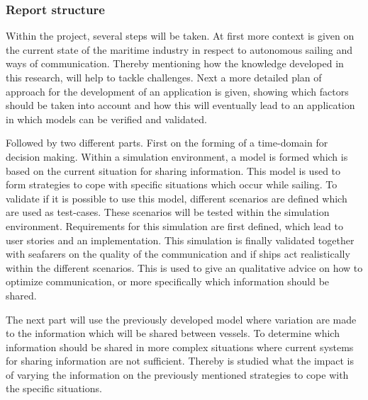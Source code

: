 \subsubsection*{Report structure}
Within the project, several steps will be taken. At first more context is given on the current state of the maritime industry in respect to autonomous sailing and ways of communication. Thereby mentioning how the knowledge developed in this research, will help to tackle challenges.
Next a more detailed plan of approach for the development of an application is given, showing which factors should be taken into account and how this will eventually lead to an application in which models can be verified and validated.

Followed by two different parts. First on the forming of a time-domain for decision making. Within a simulation environment, a model is formed which is based on the current situation for sharing information. This model is used to form strategies to cope with specific situations which occur while sailing. To validate if it is possible to use this model, different scenarios are defined which are used as test-cases. These scenarios will be tested within the simulation environment. Requirements for this simulation are first defined, which lead to user stories and an implementation.
This simulation is finally validated together with seafarers on the quality of the communication and if ships act realistically within the different scenarios. This is used to give an qualitative advice on how to optimize communication, or more specifically which information should be shared.

The next part will use the previously developed model where variation are made to the information which will be shared between vessels. To determine which information should be shared in more complex situations where current systems for sharing information are not sufficient. Thereby is studied what the impact is of varying the information on the previously mentioned strategies to cope with the specific situations.
